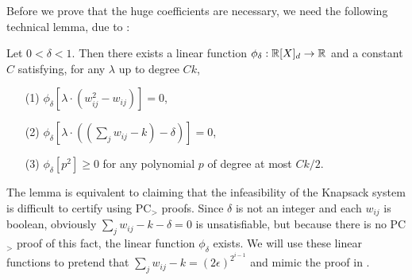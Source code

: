Before we prove that the huge coefficients are necessary, we need the following technical lemma, due to \cite{Gri01b}:
\begin{lemma}\label{lem:knapsack-pd}
Let $0 < \delta < 1$. Then there exists a linear function $\phi_\delta: \mathbb R[X]_d \rightarrow \mathbb R$ and a constant $C$ satisfying, for any $\lambda$ up to degree $Ck$,
\begin{enumerate}
\item[(1)] $\phi_\delta[\lambda\cdot(w_{ij}^2 - w_{ij})] = 0$,
\item[(2)] $\phi_\delta[\lambda\cdot((\sum_j w_{ij} - k) - \delta)] = 0$,
\item[(3)] $\phi_\delta[p^2] \geq 0$ for any polynomial $p$ of degree at most $Ck/2$.
\end{enumerate}
\end{lemma}
The lemma is equivalent to claiming that the infeasibility of the Knapsack system is difficult to certify using PC$_>$ proofs. Since $\delta$ is not an integer and each $w_{ij}$ is boolean, obviously $\sum_j w_{ij} - k - \delta = 0$ is unsatisfiable, but because there is no PC$_>$ proof of this fact, the linear function $\phi_\delta$ exists. We will use these linear functions to pretend that $\sum_j w_{ij} - k = (2\epsilon)^{2^{i-1}}$ and mimic the proof in .

